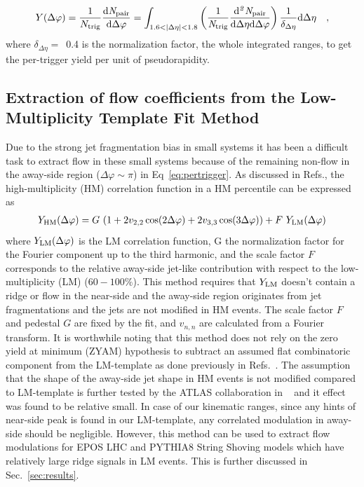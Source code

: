 \begin{eqnarray}
Y(\Delta\varphi) = \frac{1}{N_{\rm{trig}}} \frac{ \rm{d}\it{}N_{\rm{pair}} }{ \rm{d}\Delta\varphi } = \int_{1.6<|\Delta \eta|<1.8} \left( \frac{1}{\it{N}_{\rm{trig}}} \frac{ \rm{d}\it{}^{2} N_{\rm{pair}} }{ \rm{d}\Delta\eta d\Delta\varphi} \right) \dfrac{1}{\delta_{\Delta\eta}} \rm{d}\Delta \eta \quad ,
\label{eq:pertrigger}
\end{eqnarray}
where $\delta_{\Delta\eta}=$~0.4 is the normalization factor, the whole integrated ranges, to get the per-trigger yield per unit of pseudorapidity. 


\subsection{Extraction of flow coefficients from the Low-Multiplicity Template Fit Method}

Due to the strong jet fragmentation bias in small systems it has been a difficult task to extract flow in these small systems because of the remaining non-flow in the away-side region ($\Delta\varphi \sim \pi$) in Eq~\ref{eq:pertrigger}. As discussed in Refs.\cite{ATLAS:2015hzw,ATLAS:2016yzd}, the high-multiplicity (HM) correlation function in a HM percentile can be expressed as 
\begin{eqnarray}
Y_{\rm{HM}}(\Delta\varphi) = G~(1 + 2v_{2,2}\cos(2\Delta\varphi) + 2v_{3,3}\cos(3\Delta\varphi)) + F~Y_{\rm{LM}}(\Delta\varphi)
\end{eqnarray}
where $Y_{\rm{LM}}(\Delta\varphi)$ is the LM correlation function, G the normalization factor for the Fourier component up to the third harmonic, and the scale factor $F$ corresponds to the relative away-side jet-like contribution with respect to the low-multiplicity (LM) ($60-100\%$). This method requires that $Y_{\rm{LM}}$ doesn't contain a ridge or flow in the near-side and the away-side region originates from jet fragmentations and the jets are not modified in HM events. The scale factor $F$ and pedestal $G$ are fixed by the fit, and $v_{n,n}$ are calculated from a Fourier transform. It is worthwhile noting that this method does not rely on the zero yield at minimum (ZYAM) hypothesis to subtract an assumed flat combinatoric component from the LM-template as done previously in Refs.~\cite{ATLAS:2012cix,ATLAS:2014qaj}. The assumption that the shape of the away-side jet shape in HM events is not modified compared to LM-template is further tested by the ATLAS collaboration in ~\cite{ATLAS:2018ngv} and it effect was found to be relative small. In case of our kinematic ranges, since any hints of near-side peak is found in our LM-template, any correlated modulation in away-side should be negligible. However, this method can be used to extract flow modulations for EPOS LHC and PYTHIA8 String Shoving models which have relatively large ridge signals in LM events. This is further discussed in Sec.~\ref{sec:results}.

